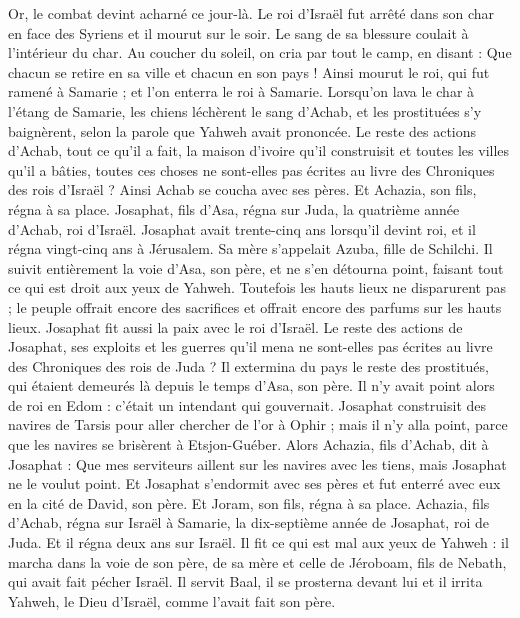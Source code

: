 \begin{multicols}{2}
Or, le combat devint acharné ce jour-là. Le roi d'Israël fut arrêté dans son char en face des Syriens et il mourut sur le soir. Le sang de sa blessure coulait à l’intérieur du char.
Au coucher du soleil, on cria par tout le camp, en disant : Que chacun se retire en sa ville et chacun en son pays !
Ainsi mourut le roi, qui fut ramené à Samarie ; et l’on enterra le roi à Samarie.
Lorsqu’on lava le char à l’étang de Samarie, les chiens léchèrent le sang d’Achab, et les prostituées s’y baignèrent, selon la parole que Yahweh avait prononcée.
Le reste des actions d'Achab, tout ce qu’il a fait, la maison d'ivoire qu'il construisit et toutes les villes qu'il a bâties, toutes ces choses ne sont-elles pas écrites au livre des Chroniques des rois d'Israël ?
Ainsi Achab se coucha avec ses pères. Et Achazia, son fils, régna à sa place.
Josaphat, fils d'Asa, régna sur Juda, la quatrième année d'Achab, roi d'Israël.
Josaphat avait trente-cinq ans lorsqu’il devint roi, et il régna vingt-cinq ans à Jérusalem. Sa mère s’appelait Azuba, fille de Schilchi.
Il suivit entièrement la voie d'Asa, son père, et ne s'en détourna point, faisant tout ce qui est droit aux yeux de Yahweh.
Toutefois les hauts lieux ne disparurent pas ; le peuple offrait encore des sacrifices et offrait encore des parfums sur les hauts lieux.
Josaphat fit aussi la paix avec le roi d'Israël.
Le reste des actions de Josaphat, ses exploits et les guerres qu'il mena ne sont-elles pas écrites au livre des Chroniques des rois de Juda ?
Il extermina du pays le reste des prostitués, qui étaient demeurés là depuis le temps d'Asa, son père.
Il n'y avait point alors de roi en Edom : c’était un intendant qui gouvernait.
Josaphat construisit des navires de Tarsis pour aller chercher de l'or à Ophir ; mais il n'y alla point, parce que les navires se brisèrent à Etsjon-Guéber.
Alors Achazia, fils d'Achab, dit à Josaphat : Que mes serviteurs aillent sur les navires avec les tiens, mais Josaphat ne le voulut point.
Et Josaphat s’endormit avec ses pères et fut enterré avec eux en la cité de David, son père. Et Joram, son fils, régna à sa place.
Achazia, fils d'Achab, régna sur Israël à Samarie, la dix-septième année de Josaphat, roi de Juda. Et il régna deux ans sur Israël.
Il fit ce qui est mal aux yeux de Yahweh : il marcha dans la voie de son père, de sa mère et celle de Jéroboam, fils de Nebath, qui avait fait pécher Israël.
Il servit Baal, il se prosterna devant lui et il irrita Yahweh, le Dieu d'Israël, comme l’avait fait son père.
\PPE{}
\end{multicols}

